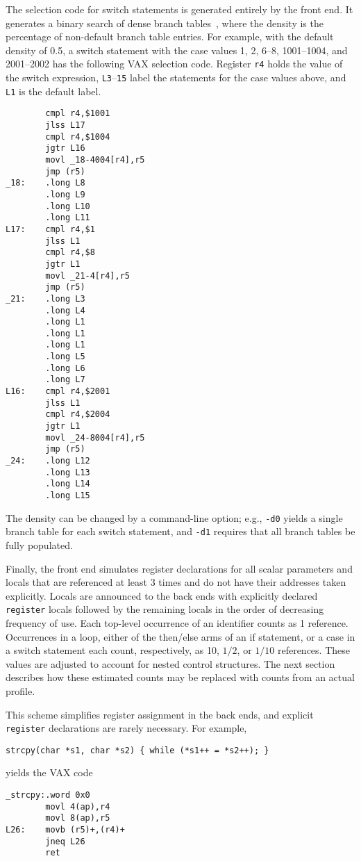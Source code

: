 The selection code for switch statements is generated entirely by the front end.
It generates a binary search of dense branch tables~\cite{bernstein85},
where the density is the percentage of non-default branch table entries.
For example, with the default density of 0.5, a switch statement
with the case values 1, 2, 6--8, 1001--1004, and 2001--2002 has the
following VAX selection code.
Register \verb|r4| holds the value of the switch expression,
\verb|L3|--\verb|15| label the statements for the case values above,
and \verb|L1| is the default label.
\begin{verbatim}
        cmpl r4,$1001
        jlss L17
        cmpl r4,$1004
        jgtr L16
        movl _18-4004[r4],r5
        jmp (r5)
_18:    .long L8
        .long L9
        .long L10
        .long L11
L17:    cmpl r4,$1
        jlss L1
        cmpl r4,$8
        jgtr L1
        movl _21-4[r4],r5
        jmp (r5)
_21:    .long L3
        .long L4
        .long L1
        .long L1
        .long L1
        .long L5
        .long L6
        .long L7
L16:    cmpl r4,$2001
        jlss L1
        cmpl r4,$2004
        jgtr L1
        movl _24-8004[r4],r5
        jmp (r5)
_24:    .long L12
        .long L13
        .long L14
        .long L15
\end{verbatim}
The density can be changed by a command-line option;
e.g., \verb|-d0| yields a single branch
table for each switch statement, and \verb|-d1| requires that all
branch tables be fully populated.

Finally, the front end simulates register declarations for
all scalar parameters and locals that are referenced at least
3 times and do not have their addresses taken explicitly.
Locals are announced to the back ends with
explicitly declared \verb|register| locals followed by
the remaining locals in the order of decreasing frequency of use.
Each top-level occurrence of an identifier
counts as 1 reference. Occurrences in a loop,
either of the then/else arms of an if statement, or a case
in a switch statement each count, respectively, as 10, $1/2$, or $1/10$ references.
These values are adjusted to account for nested control structures.
The next section describes how these estimated counts
may be replaced with counts from an actual profile.

This scheme simplifies register assignment in the back ends,
and explicit \verb|register| declarations are rarely necessary.
For example,
\begin{verbatim}
strcpy(char *s1, char *s2) { while (*s1++ = *s2++); }
\end{verbatim}
yields the VAX code
\begin{verbatim}
_strcpy:.word 0x0
        movl 4(ap),r4
        movl 8(ap),r5
L26:    movb (r5)+,(r4)+
        jneq L26
        ret
\end{verbatim}


